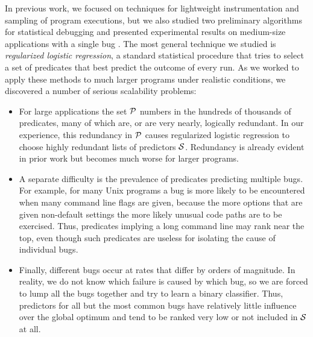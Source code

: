 \documentclass[final]{sigplanconf}
\newcommand{\termdef}[1]{\emph{#1}}
\begin{document}
In previous work, we focused on techniques
for lightweight instrumentation and sampling of program executions, but
we also studied two preliminary algorithms for statistical debugging and
presented experimental results on medium-size applications with a
single bug \cite{PLDI`03*141,NIPS2003_AP05}.  The most general
technique we studied is \termdef{regularized logistic regression}, a standard
statistical procedure that tries to select a set of predicates that
best predict the outcome of every run. As we worked to apply these
methods to much larger programs under realistic conditions, we
discovered a number of serious scalability problems:
\begin{itemize}

\item For large applications the set ${\cal P}$ numbers in the hundreds of
thousands of predicates, many of which are, or are very nearly,
logically redundant.  In our experience, this redundancy in ${\cal P}$
causes regularized logistic regression to choose highly redundant lists of
predictors ${\cal S}$.  Redundancy is
already evident in prior work \cite{PLDI`03*141} but becomes much
worse for larger programs.

\item A separate difficulty is the prevalence of predicates predicting
multiple bugs.  For example, for many Unix programs a bug is more
likely to be encountered when many command line flags are given,
because the more options that are given non-default settings the more
likely unusual code paths are to be exercised.  Thus, predicates
implying a long command line may rank near the top, even though such
predicates are useless for isolating the cause of individual bugs.

\item Finally, different bugs occur at rates that differ by orders of
magnitude.  In reality, we do not know which failure is caused by which bug,
so we are forced to lump all the bugs together and try to learn a binary
classifier.  Thus, predictors for all but the most common bugs have relatively little
influence over the global optimum and tend to be ranked very low or not included
in ${\cal S}$ at all.

\end{itemize}
\end{document}
